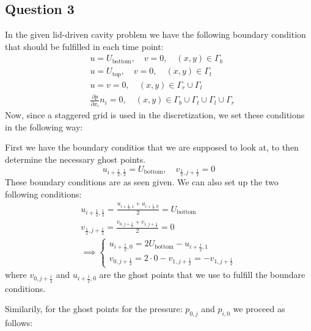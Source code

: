 \documentclass[10pt]{report}
\newcommand{\p}{\partial}
\begin{document}
\subsection*{Question 3}
In the given lid-driven cavity problem we have the following boundary condition that should be 
fulfilled in each time point:
\begin{align*}
    &u = U_{\text{bottom}},\quad v = 0, \quad (x,y) \in \Gamma_b\\
    &u = U_{\text{top}},\quad v = 0, \quad (x,y) \in \Gamma_t\\
    &u = v = 0,\quad (x,y) \in \Gamma_r \cup \Gamma_l\\
    &\frac{\p p}{\p x_i}n_i = 0, \quad (x,y) \in \Gamma_b \cup \Gamma_t \cup \Gamma_l \cup \Gamma_r
\end{align*}
Now, since a staggered grid is used in the discretization, we set these conditions in the following way:

First we have the boundary conditios that we are supposed to look at, to then determine the necessary ghost points.
\begin{equation}
    u_{i+\frac{1}{2},\frac{1}{2}}= U_{\text{bottom}},\quad v_{\frac{1}{2},j+\frac{1}{2}} = 0
\end{equation}
These boundary conditions are as seen given. We can also set up the two following conditions:
\begin{gather*}
    u_{i+\frac{1}{2},\frac{1}{2}} = \frac{u_{i+\frac{1}{2},1}+u_{i+\frac{1}{2},0}}{2} = U_{\text{bottom}}\\
    v_{\frac{1}{2},j+\frac{1}{2}} = \frac{v_{0,j+\frac{1}{2}} +v_{1,j+\frac{1}{2}} }{2} = 0\\
    \implies \begin{cases}u_{i+\frac{1}{2},0} = 2U_{\text{bottom}}-u_{i+\frac{1}{2},1}\\
    v_{0,j+\frac{1}{2}} = 2\cdot 0 -v_{1,j+\frac{1}{2}} = - v_{1,j+\frac{1}{2}} \end{cases}
\end{gather*}
where $v_{0,j+\frac{1}{2}}$ and $u_{i+\frac{1}{2},0}$ are the ghost points that we use to fulfill the
boundare conditions.

Similarily, for the ghost points for the pressure: $p_{0,j}$ and $p_{i,0}$ we proceed as follows:
\end{document}
